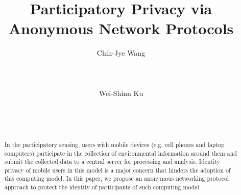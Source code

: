 \documentclass{IEEEtran}
\begin{document}
\title{Participatory Privacy via Anonymous Network Protocols}



\author{
\alignauthor Chih-Jye Wang\\
      \\
      \\
     \\
\alignauthor Wei-Shinn Ku\\
       \\
       \\
      \\
}




\maketitle

\begin{abstract}
In the participatory sensing, users with mobile devices (e.g. cell phones
and laptop computers) participate in the collection of environmental
information around them and submit the collected data to a central server
for processing and analysis. Identity privacy of mobile users in this model
is a major concern that hinders the adoption of this computing model. In
this paper, we propose an anonymous networking protocol approach to protect
the identity of participants of such computing model.
\end{abstract}









%
\end{document}
